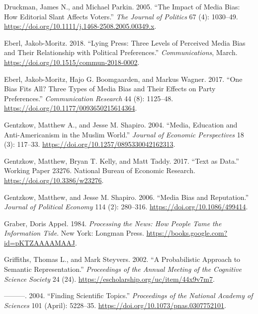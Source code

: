 \documentclass[
  12pt,
]{article}
\newlength{\cslhangindent}
\newlength{\cslentryspacingunit} %
\newenvironment{CSLReferences}[2] %
 {%
  \setlength{\parindent}{0pt}
  \ifodd #1
  \let\oldpar\par
  \def\par{\hangindent=\cslhangindent\oldpar}
  \fi
  \setlength{\parskip}{#2\cslentryspacingunit}
 }%
 {}
\begin{document}
\begin{CSLReferences}{1}{0}
\leavevmode{}%
Druckman, James N., and Michael Parkin. 2005. {``The {Impact} of {Media
Bias}: {How Editorial Slant Affects Voters}.''} \emph{The Journal of
Politics} 67 (4): 1030--49.
\url{https://doi.org/10.1111/j.1468-2508.2005.00349.x}.

\leavevmode{}%
Eberl, Jakob-Moritz. 2018. {``Lying Press: {Three} Levels of Perceived
Media Bias and Their Relationship with Political Preferences.''}
\emph{Communications}, March.
\url{https://doi.org/10.1515/commun-2018-0002}.

\leavevmode{}%
Eberl, Jakob-Moritz, Hajo G. Boomgaarden, and Markus Wagner. 2017.
{``One {Bias Fits All}? {Three Types} of {Media Bias} and {Their
Effects} on {Party Preferences}.''} \emph{Communication Research} 44
(8): 1125--48. \url{https://doi.org/10.1177/0093650215614364}.

\leavevmode{}%
Gentzkow, Matthew A., and Jesse M. Shapiro. 2004. {``Media, {Education}
and {Anti-Americanism} in the {Muslim World}.''} \emph{Journal of
Economic Perspectives} 18 (3): 117--33.
\url{https://doi.org/10.1257/0895330042162313}.

\leavevmode{}%
Gentzkow, Matthew, Bryan T. Kelly, and Matt Taddy. 2017. {``Text as
{Data}.''} Working Paper 23276. {National Bureau of Economic Research}.
\url{https://doi.org/10.3386/w23276}.

\leavevmode{}%
Gentzkow, Matthew, and Jesse M. Shapiro. 2006. {``Media {Bias} and
{Reputation}.''} \emph{Journal of Political Economy} 114 (2): 280--316.
\url{https://doi.org/10.1086/499414}.

\leavevmode{}%
Graber, Doris Appel. 1984. \emph{Processing the {News}: {How People
Tame} the {Information Tide}}. {New York}: {Longman Press}.
\url{https://books.google.com?id=pKTZAAAAMAAJ}.

\leavevmode{}%
Griffiths, Thomas L., and Mark Steyvers. 2002. {``A Probabilistic
Approach to Semantic Representation.''} \emph{Proceedings of the Annual
Meeting of the Cognitive Science Society} 24 (24).
\url{https://escholarship.org/uc/item/44x9v7m7}.

\leavevmode{}%
---------. 2004. {``Finding Scientific Topics.''} \emph{Proceedings of
the National Academy of Sciences} 101 (April): 5228--35.
\url{https://doi.org/10.1073/pnas.0307752101}.


\end{CSLReferences}
\end{document}

